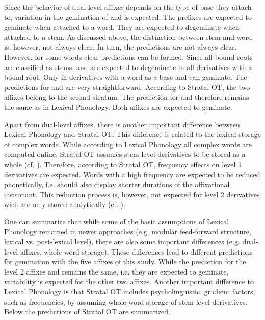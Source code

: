 Since the behavior of dual-level affixes depends on the type of base they attach to, variation in the gemination of  and  is expected. The prefixes are expected to geminate when attached to a word. They are expected to degeminate when attached to a stem. As discussed above, the distinction between stem and word is, however, not always clear. In turn, the predictions are not always clear. However, for some words clear predictions can be formed. Since all bound roots are classified as stems,  and  are expected to degeminate in all derivatives with a bound root. Only in derivatives with a word as a base  and  can geminate.
The predictions for  and  are very straightforward. According to Stratal OT, the two affixes belong to the second stratum. The prediction for  and  therefore remains the same as in Lexical Phonology. Both affixes are expected to geminate.

\clearpage

Apart from dual-level affixes, there is another important difference between Lexical Phonology and Stratal OT.  This difference is related to the lexical storage of complex words. While according to Lexical Phonology all complex words are computed online, Stratal OT assumes stem-level derivatives to be stored as a whole (cf. \citealt[chapter 3]{BermudezOtero.2012}). Therefore, according to Stratal OT, frequency effects on level 1 derivatives are expected.  Words with a high frequency are expected to be reduced phonetically, i.e. should also display shorter durations of the affixational consonant. This reduction process is, however, not expected for level 2 derivatives wich are only stored analytically (cf. \citealt[chapter 3.3]{BermudezOtero.2012}). %



One can summarize that while some of the basic assumptions of Lexical Phonology remained in newer approaches (e.g. modular feed-forward structure, lexical vs. post-lexical level), there are also some important differences (e.g. dual-level affixes, whole-word storage). These differences lead to different predictions for gemination with the five affixes of this study. While the prediction for the level 2 affixes  and  remains the same, i.e. they are expected to geminate, variability is expected for the other two affixes. Another important difference to Lexical Phonology is that Stratal OT includes psycholinguistic, gradient factors, such as frequencies, by assuming whole-word storage of stem-level derivatives. Below the predictions of Stratal OT are summarized.\\



